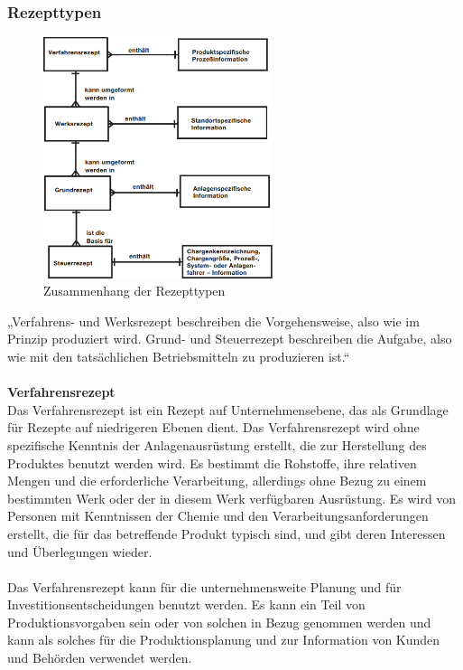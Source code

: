 \subsubsection{Rezepttypen}
\begin{figure}[h!]
		\centering
		\includegraphics[width=0.6\textwidth]{graphics/stateoftheart/rezepttypen.png}
		\caption{Zusammenhang der Rezepttypen}
\end{figure}
„Verfahrens- und Werksrezept beschreiben die Vorgehensweise, also wie im Prinzip produziert wird. Grund- und Steuerrezept beschreiben die Aufgabe, also wie mit den tatsächlichen Betriebsmitteln zu produzieren ist.“
\\\\
\textbf{Verfahrensrezept}\\
Das Verfahrensrezept ist ein Rezept auf Unternehmensebene, das als Grundlage für Rezepte auf niedrigeren Ebenen dient. Das Verfahrensrezept wird ohne spezifische Kenntnis der Anlagenausrüstung erstellt, die zur Herstellung des Produktes benutzt werden wird. Es bestimmt die Rohstoffe, ihre relativen Mengen und die erforderliche Verarbeitung, allerdings ohne Bezug zu einem bestimmten Werk oder der in diesem Werk verfügbaren Ausrüstung. Es wird von Personen mit Kenntnissen der Chemie und den Verarbeitungsanforderungen erstellt, die für das betreffende Produkt typisch sind, und gibt deren Interessen und Überlegungen wieder.\\\\
Das Verfahrensrezept kann für die unternehmensweite Planung und für Investitionsentscheidungen benutzt werden. Es kann ein Teil von Produktionsvorgaben sein oder von solchen in Bezug genommen werden und kann als solches für die Produktionsplanung und zur Information von Kunden und Behörden verwendet werden.
